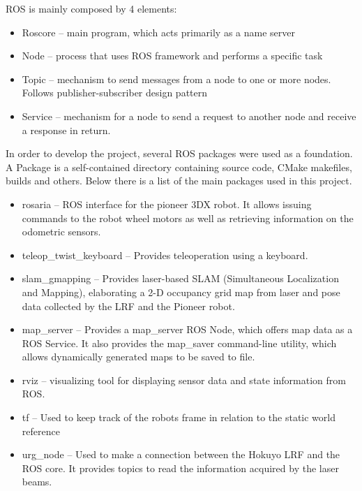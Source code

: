ROS is mainly composed by 4 elements:
\begin{itemize}
\item Roscore -- main program, which acts primarily as a name server
\item Node -- process that uses ROS framework and performs a specific task
\item Topic -- mechanism to send messages from a node to one or more nodes. Follows publisher-subscriber design pattern
\item Service -- mechanism for a node to send a request to another node and receive a response in return.
\end{itemize}
In order to develop the project, several ROS packages were used as a foundation. A Package is a self-contained directory containing source code, CMake makefiles, builds and others. Below there is a list of the main packages used in this project.
\begin{itemize}
\item rosaria -- ROS interface for the pioneer 3DX robot. It allows issuing commands to the robot wheel motors as well as retrieving information on the odometric sensors.
\item teleop\_twist\_keyboard -- Provides teleoperation using a keyboard. %
\item slam\_gmapping -- Provides laser-based SLAM (Simultaneous Localization and Mapping), elaborating a 2-D occupancy grid map from laser and pose data collected by the LRF and the Pioneer robot.
\item map\_server -- Provides a map\_server ROS Node, which offers map data as a ROS Service. It also provides the map\_saver command-line utility, which allows dynamically generated maps to be saved to file.
\item rviz -- visualizing tool for displaying sensor data and state information from ROS.
\item tf -- Used to keep track of the robots frame in relation to the static world reference
\item urg\_node -- Used to make a connection between the Hokuyo LRF and the ROS core. It provides topics to read the information acquired by the laser beams. 
\end{itemize}



